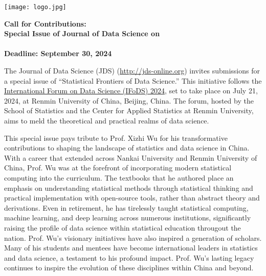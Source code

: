\documentclass[12pt]{article}
\begin{document}
\pagestyle{empty}


\noindent
\begin{minipage}[m]{1.74in}
\texttt{[image: logo.jpg]}
\end{minipage}
\hfill
\begin{minipage}[m]{5in}
\begin{center}
  {\color{dukeblue}
    {\bf\LARGE Call for Contributions:}}\\[1ex]
  {\bf\large Special Issue of Journal of Data Science on}\\[1ex]
  {\color{dukeblue}{\bf\large  Statistical Frontiers of Data Science}\\[1ex]
  {\bf Deadline: September 30, 2024}}
\end{center}
\end{minipage}

\bigskip

The Journal of Data Science (JDS) (\url{http://jds-online.org})
invites submissions for a special issue of ``Statistical Frontiers of
Data Science.''  This initiative follows the
\href{https://statds.org/events/ifods2024}{International Forum on Data
  Science (IFoDS) 2024}, set to take place on July 21, 2024, at
Renmin University of China, Beijing, China. The forum, hosted by the
School of Statistics and the Center for Applied Statistics at Renmin
University, aims to meld the theoretical and practical realms of data
science.


This special issue pays tribute to Prof. Xizhi Wu for his
transformative contributions to shaping the landscape of statistics
and data science in China. With a career that extended across Nankai
University and Renmin University of China, Prof. Wu was at the
forefront of incorporating modern statistical computing into the
curriculum. The textbooks that he authored place an emphasis on
understanding statistical methods through statistical thinking and
practical implementation with open-source tools, rather than
abstract theory and derivations. Even in retirement, he has tirelessly
taught statistical computing, machine learning, and deep learning
across numerous institutions, significantly raising the profile of
data science within statistical education througout the nation.
Prof. Wu's visionary initiatives have also inspired a generation of
scholars. Many of his students and mentees have become
international leaders in statistics and data science, a testament to
his profound impact. Prof. Wu's lasting legacy continues to inspire
the evolution of these disciplines within China and beyond.
\end{document}
